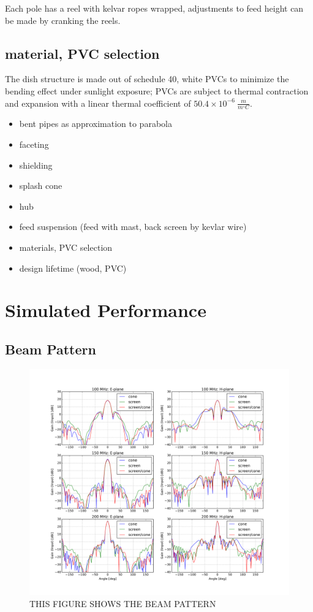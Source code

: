 \documentclass[preprint]{aastex}  %
\begin{document}
Each pole has a reel with kelvar ropes wrapped, adjustments to feed height can be made by cranking the reels.


\subsection{material, PVC selection}
The dish structure is made out of schedule 40, white PVCs to minimize the bending effect under sunlight exposure; PVCs are subject to thermal contraction and expansion with a linear thermal coefficient of $50.4\times10^{-6}\ \frac{m}{m^{\circ}C}$.


\begin{itemize}
\item bent pipes as approximation to parabola 
\item faceting
\item shielding
\item splash cone
\item hub 
\item feed suspension (feed with mast, back screen by kevlar wire)
\item materials, PVC selection 
\item design lifetime (wood, PVC)
\end{itemize}

\section{Simulated Performance}
\label{sec:sim}

\subsection{Beam Pattern}

\begin{figure}[H]
	\begin{center}
	\includegraphics[width =\textwidth]{./dish_plots/Beampatterns_cone}
	\caption{THIS FIGURE SHOWS THE BEAM PATTERN 
\label{Fig:} }
	\end{center}
\end{figure}
\clearpage
\end{document}

